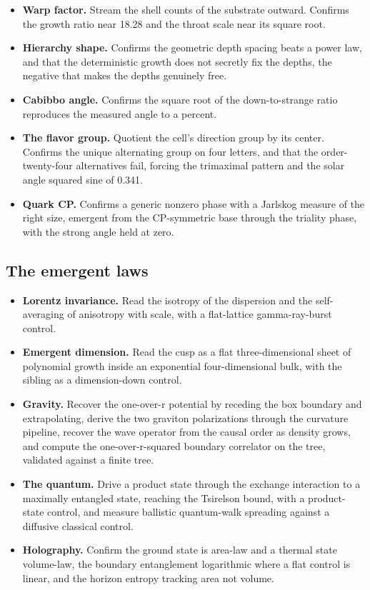 \begin{itemize}
\item \textbf{Warp factor.} Stream the shell counts of the substrate outward. Confirms the growth ratio near 18.28 and the throat scale near its square root.
\item \textbf{Hierarchy shape.} Confirms the geometric depth spacing beats a power law, and that the deterministic growth does not secretly fix the depths, the negative that makes the depths genuinely free.
\item \textbf{Cabibbo angle.} Confirms the square root of the down-to-strange ratio reproduces the measured angle to a percent.
\item \textbf{The flavor group.} Quotient the cell's direction group by its center. Confirms the unique alternating group on four letters, and that the order-twenty-four alternatives fail, forcing the trimaximal pattern and the solar angle squared sine of 0.341.
\item \textbf{Quark CP.} Confirms a generic nonzero phase with a Jarlskog measure of the right size, emergent from the CP-symmetric base through the triality phase, with the strong angle held at zero.
\end{itemize}

\subsection*{The emergent laws}

\begin{itemize}
\item \textbf{Lorentz invariance.} Read the isotropy of the dispersion and the self-averaging of anisotropy with scale, with a flat-lattice gamma-ray-burst control.
\item \textbf{Emergent dimension.} Read the cusp as a flat three-dimensional sheet of polynomial growth inside an exponential four-dimensional bulk, with the sibling as a dimension-down control.
\item \textbf{Gravity.} Recover the one-over-r potential by receding the box boundary and extrapolating, derive the two graviton polarizations through the curvature pipeline, recover the wave operator from the causal order as density grows, and compute the one-over-r-squared boundary correlator on the tree, validated against a finite tree.
\item \textbf{The quantum.} Drive a product state through the exchange interaction to a maximally entangled state, reaching the Tsirelson bound, with a product-state control, and measure ballistic quantum-walk spreading against a diffusive classical control.
\item \textbf{Holography.} Confirm the ground state is area-law and a thermal state volume-law, the boundary entanglement logarithmic where a flat control is linear, and the horizon entropy tracking area not volume.
\end{itemize}

